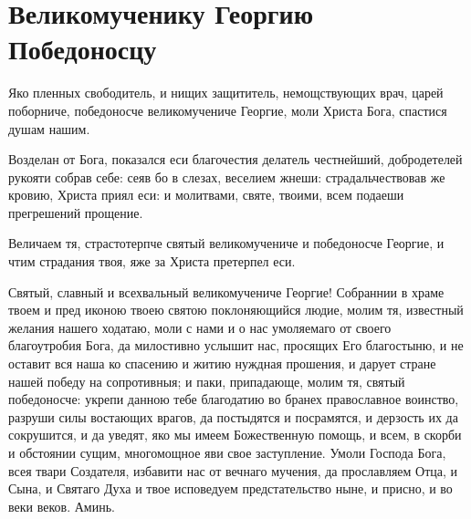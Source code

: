 \section{Великомученику Георгию Победоносцу}\begin{mymulticols}

\ifpdf
\else
\fi


Яко пленных свободитель, и нищих защититель, немощствующих врач, царей поборниче, победоносче великомучениче Георгие, моли Христа Бога, спастися душам нашим.


Возделан от Бога, показался еси благочестия делатель честнейший, добродетелей рукояти собрав себе: сеяв бо в слезах, веселием жнеши: страдальчествовав же кровию, Христа приял еси: и молитвами, святе, твоими, всем подаеши прегрешений прощение.


Величаем тя, страстотерпче святый великомучениче и победоносче Георгие, и чтим страдания твоя, яже за Христа претерпел еси.


Святый, славный и всехвальный великомучениче Георгие! Собраннии в храме твоем и пред иконою твоею святою поклоняющийся людие, молим тя, известный желания нашего ходатаю, моли с нами и о нас умоляемаго от своего благоутробия Бога, да милостивно услышит нас, просящих Его благостыню, и не оставит вся наша ко спасению и житию нуждная прошения, и дарует стране нашей победу на сопротивныя; и паки, припадающе, молим тя, святый победоносче: укрепи данною тебе благодатию во бранех православное воинство, разруши силы востающих врагов, да постыдятся и посрамятся, и дерзость их да сокрушится, и да уведят, яко мы имеем Божественную помощь, и всем, в скорби и обстоянии сущим, многомощное яви свое заступление. Умоли Господа Бога, всея твари Создателя, избавити нас от вечнаго мучения, да прославляем Отца, и Сына, и Святаго Духа и твое исповедуем предстательство ныне, и присно, и во веки веков. Аминь.

\ifpdf
\else
\fi

\end{mymulticols}

